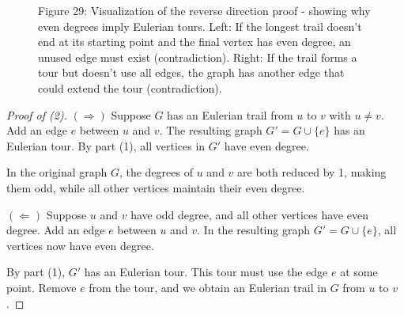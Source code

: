 \documentclass{article}
\theoremstyle{definition}
\begin{document}
\begin{figure}[ht]
\vspace{0.3cm}
{\centering
\small Figure 29: Visualization of the reverse direction proof - showing why even degrees imply Eulerian tours. Left: If the longest trail doesn't end at its starting point and the final vertex has even degree, an unused edge must exist (contradiction). Right: If the trail forms a tour but doesn't use all edges, the graph has another edge that could extend the tour (contradiction).
\par}
\end{figure}

\begin{proof}[Proof of (2)]
$(\Rightarrow)$ Suppose $G$ has an Eulerian trail from $u$ to $v$ with $u \neq v$. Add an edge $e$ between $u$ and $v$. The resulting graph $G' = G \cup \{e\}$ has an Eulerian tour. By part (1), all vertices in $G'$ have even degree.

In the original graph $G$, the degrees of $u$ and $v$ are both reduced by 1, making them odd, while all other vertices maintain their even degree.

$(\Leftarrow)$ Suppose $u$ and $v$ have odd degree, and all other vertices have even degree. Add an edge $e$ between $u$ and $v$. In the resulting graph $G' = G \cup \{e\}$, all vertices now have even degree.

By part (1), $G'$ has an Eulerian tour. This tour must use the edge $e$ at some point. Remove $e$ from the tour, and we obtain an Eulerian trail in $G$ from $u$ to $v$.
\end{proof}
\end{document}
